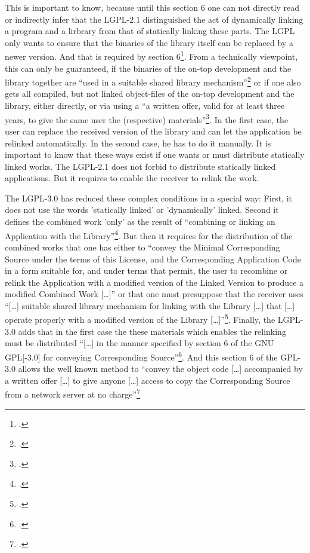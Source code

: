 \begin{itemize}
  This is important to know, because until this section 6 one can not directly
  read or indirectly infer that the LGPL-2.1 distinguished the act of
  dynamically linking a program and a lirbrary from that of statically linking
  these parts. The LGPL only wants to ensure that the binaries of the library
  itself can be replaced by a newer version. And that is required by section
  6\footcite[cf.][\nopage wp.\ §6]{Lgpl21OsiLicense1999a}.
  From a technically viewpoint, this can only be guaranteed, if the binaries of
  the on-top development and the library together are \enquote{used in a
  suitable shared library mechanism}\footcite[cf.][\nopage wp.\
  §6]{Lgpl21OsiLicense1999a} or if one also gets all compiled, but not linked
  object-files of the on-top development and the library, either directly, or
  via using a \enquote{a written offer, valid for at least three years, to give
  the same user the (respective) materials}\footcite[cf.][\nopage wp.\
  §6]{Lgpl21OsiLicense1999a}. In the first case, the user can replace the
  received version of the library and can let the application be relinked
  automatically. In the second case, he has to do it manually. It is important
  to know that these ways exist if one wants or must distribute statically
  linked works. The LGPL-2.1 does not forbid to distribute statically linked
  applications. But it requires to enable the receiver to relink the work.
  
  The LGPL-3.0 has reduced these complex conditions in a special way: First, it
  does not use the words 'statically linked' or 'dynamically' linked. Second it
  defines the combined work 'only' as the result of \enquote{combining or
  linking an Application with the Library}\footcite[cf.][\nopage wp.\
  §0]{Lgpl30OsiLicense2007a}. But then it requires for the distribution of the
  combined works that one has either to \enquote{convey the Minimal
  Corresponding Source under the terms of this License, and the Corresponding
  Application Code in a form suitable for, and under terms that permit, the user
  to recombine or relink the Application with a modified version of the Linked
  Version to produce a modified Combined Work [\ldots]} or that one must
  presuppose that the receiver uses \enquote{[\ldots] suitable shared library
  mechanism for linking with the Library [\ldots] that [\ldots] operate properly
  with a modified version of the Library [\ldots]}\footcite[cf.][\nopage wp.\
  §4]{Lgpl30OsiLicense2007a}. Finally, the LGPL-3.0 adds that in the first case
  the these materials which enables the relinking must be distributed
  \enquote{[\ldots] in the manner specified by section 6 of the GNU GPL[-3.0]
  for conveying Corresponding Source}\footcite[cf.][\nopage wp.\
  §4]{Lgpl30OsiLicense2007a}. And this section 6 of the GPL-3.0 allows the well
  known method to \enquote{convey the object code [\ldots] accompanied by a
  written offer [\ldots] to give anyone [\ldots] access to copy the
  Corresponding Source from a network server at no charge}\footcite[cf.][\nopage
  wp.\ §6]{Gpl30OsiLicense2007a}


\end{itemize}
